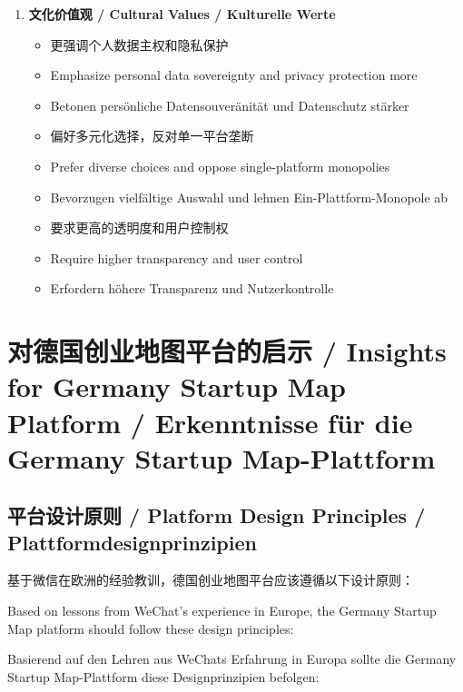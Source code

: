 \documentclass[11pt,a4paper]{article}
\begin{document}
\begin{enumerate}
    \item \textbf{文化价值观 / Cultural Values / Kulturelle Werte}
    \begin{itemize}
        \item 更强调个人数据主权和隐私保护
        \item Emphasize personal data sovereignty and privacy protection more
        \item Betonen persönliche Datensouveränität und Datenschutz stärker
        \item 偏好多元化选择，反对单一平台垄断
        \item Prefer diverse choices and oppose single-platform monopolies
        \item Bevorzugen vielfältige Auswahl und lehnen Ein-Plattform-Monopole ab
        \item 要求更高的透明度和用户控制权
        \item Require higher transparency and user control
        \item Erfordern höhere Transparenz und Nutzerkontrolle
    \end{itemize}
\end{enumerate}

\section{对德国创业地图平台的启示 / Insights for Germany Startup Map Platform / Erkenntnisse für die Germany Startup Map-Plattform}

\subsection{平台设计原则 / Platform Design Principles / Plattformdesignprinzipien}

基于微信在欧洲的经验教训，德国创业地图平台应该遵循以下设计原则：

Based on lessons from WeChat's experience in Europe, the Germany Startup Map platform should follow these design principles:

Basierend auf den Lehren aus WeChats Erfahrung in Europa sollte die Germany Startup Map-Plattform diese Designprinzipien befolgen:
\end{document}
